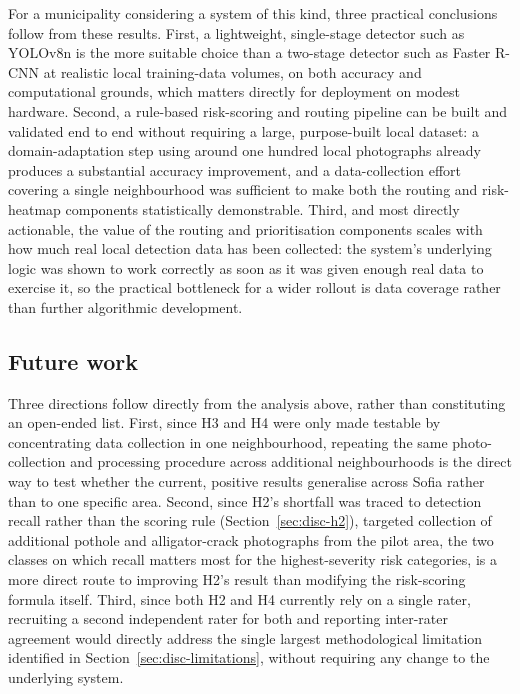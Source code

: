 \documentclass[10pt,a4paper,twocolumn]{article}
\begin{document}
For a municipality considering a system of this kind, three practical
conclusions follow from these results. First, a lightweight, single-stage
detector such as YOLOv8n is the more suitable choice than a two-stage
detector such as Faster R-CNN at realistic local training-data volumes,
on both accuracy and computational grounds, which matters directly for
deployment on modest hardware. Second, a rule-based risk-scoring and
routing pipeline can be built and validated end to end without requiring
a large, purpose-built local dataset: a domain-adaptation step using
around one hundred local photographs already produces a substantial
accuracy improvement, and a data-collection effort covering a single
neighbourhood was sufficient to make both the routing and risk-heatmap
components statistically demonstrable. Third, and most directly
actionable, the value of the routing and prioritisation components scales
with how much real local detection data has been collected: the system's
underlying logic was shown to work correctly as soon as it was given
enough real data to exercise it, so the practical bottleneck for a wider
rollout is data coverage rather than further algorithmic development.

\subsection{Future work}
\label{sec:disc-future-work}

Three directions follow directly from the analysis above, rather than
constituting an open-ended list. First, since H3 and H4 were only made
testable by concentrating data collection in one neighbourhood, repeating
the same photo-collection and processing procedure across additional
neighbourhoods is the direct way to test whether the current, positive
results generalise across Sofia rather than to one specific area.
Second, since H2's shortfall was traced to detection recall rather than
the scoring rule (Section~\ref{sec:disc-h2}), targeted collection of
additional pothole and alligator-crack photographs from the pilot area,
the two classes on which recall matters most for the highest-severity
risk categories, is a more direct route to improving H2's result than
modifying the risk-scoring formula itself. Third, since both H2 and H4
currently rely on a single rater, recruiting a second independent rater
for both and reporting inter-rater agreement would directly address the
single largest methodological limitation identified in
Section~\ref{sec:disc-limitations}, without requiring any change to the
underlying system.
\end{document}
